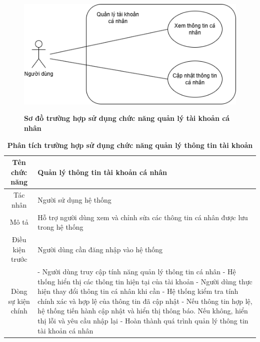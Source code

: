 \begin{figure}[H]
	\centering
	\includegraphics[width=12cm,height=6cm]{Images/use_case/use_case_account_info.png}
	\caption[Sơ đồ trường hợp sử dụng chức năng quản lý tài khoản cá nhân]{\bfseries \fontsize{12pt}{0pt}
		\selectfont Sơ đồ trường hợp sử dụng chức năng quản lý tài khoản cá nhân}
	\label{use_case_account_info} %
\end{figure}

\begin{table}[H]
	\caption{\bfseries \fontsize{12pt}{0pt}\selectfont Phân tích trường hợp sử dụng chức năng quản lý thông tin tài khoản}
	\centering
	\begin{tabularx}{0.9\textwidth}{|c|X|}
		\hline
		\textbf{Tên chức năng} & \textbf{Quản lý thông tin tài khoản cá nhân}                                     \\
		\hline
		Tác nhân               & Người sử dụng hệ thống                                                           \\
		\hline
		Mô tả                  & Hỗ trợ người dùng xem và chỉnh sửa các thông tin cá nhân được lưu trong hệ thống \\
		\hline
		Điều kiện trước        & Người dùng cần đăng nhập vào hệ thống                                            \\
		\hline
		Dòng sự kiện chính     &
		- Người dùng truy cập tính năng quản lý thông tin cá nhân \newline
		- Hệ thống hiển thị các thông tin hiện tại của tài khoản \newline
		- Người dùng thực hiện thay đổi thông tin cá nhân khi cần \newline
		- Hệ thống kiểm tra tính chính xác và hợp lệ của thông tin đã cập nhật \newline
		- Nếu thông tin hợp lệ, hệ thống tiến hành cập nhật và hiển thị thông báo. Nếu không, hiển thị lỗi và yêu cầu nhập lại \newline
		- Hoàn thành quá trình quản lý thông tin tài khoản cá nhân                                                \\
		\hline
	\end{tabularx}
\end{table}

